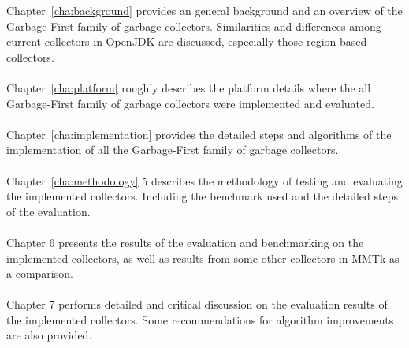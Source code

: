 Chapter~\ref{cha:background} provides an general background and an overview of the Garbage-First family of garbage collectors.
Similarities and differences among current collectors in OpenJDK are discussed,
especially those region-based collectors.
\\\\
Chapter~\ref{cha:platform} roughly describes the platform details where the all Garbage-First
family of garbage collectors were implemented and evaluated.
\\\\
Chapter~\ref{cha:implementation} provides the detailed steps and algorithms of the implementation of
all the Garbage-First family of garbage collectors.
\\\\
Chapter~\ref{cha:methodology} 5 describes the methodology of testing and evaluating the implemented collectors.
Including the benchmark used and the detailed steps of the evaluation.
\\\\
Chapter 6 presents the results of the evaluation and benchmarking on the implemented collectors,
as well as results from some other collectors in MMTk as a comparison.
\\\\
Chapter 7 performs detailed and critical discussion on the evaluation results of the
implemented collectors. Some recommendations for algorithm improvements are also provided.